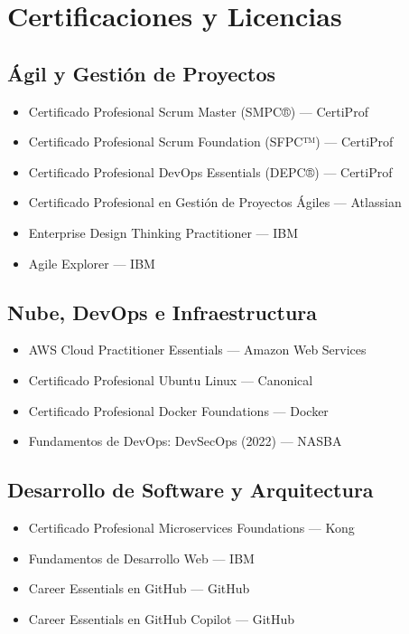\section*{Certificaciones y Licencias}

\subsection{Ágil y Gestión de Proyectos}
\begin{itemize}[leftmargin=12pt]
    \item Certificado Profesional Scrum Master (SMPC®) — CertiProf
    \item Certificado Profesional Scrum Foundation (SFPC™) — CertiProf
    \item Certificado Profesional DevOps Essentials (DEPC®) — CertiProf
    \item Certificado Profesional en Gestión de Proyectos Ágiles — Atlassian
    \item Enterprise Design Thinking Practitioner — IBM
    \item Agile Explorer — IBM
\end{itemize}

\subsection{Nube, DevOps e Infraestructura}
\begin{itemize}[leftmargin=12pt]
    \item AWS Cloud Practitioner Essentials — Amazon Web Services
    \item Certificado Profesional Ubuntu Linux — Canonical
    \item Certificado Profesional Docker Foundations — Docker
    \item Fundamentos de DevOps: DevSecOps (2022) — NASBA
\end{itemize}

\subsection{Desarrollo de Software y Arquitectura}
\begin{itemize}[leftmargin=12pt]
    \item Certificado Profesional Microservices Foundations — Kong
    \item Fundamentos de Desarrollo Web — IBM
    \item Career Essentials en GitHub — GitHub
    \item Career Essentials en GitHub Copilot — GitHub
\end{itemize}

